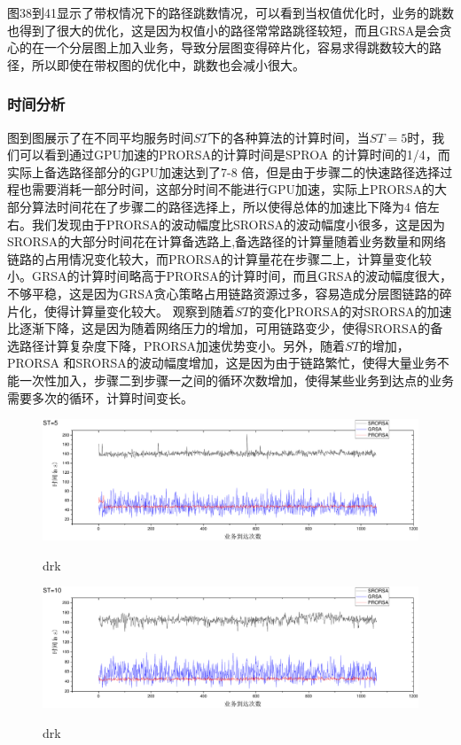图38到41显示了带权情况下的路径跳数情况，可以看到当权值优化时，业务的跳数也得到了很大的优化，这是因为权值小的路径常常路跳径较短，而且GRSA是会贪心的在一个分层图上加入业务，导致分层图变得碎片化，容易求得跳数较大的路径，所以即使在带权图的优化中，跳数也会减小很大。
\subsubsection{时间分析}

图到图展示了在不同平均服务时间$ST$下的各种算法的计算时间，当$ST=5$时，我们可以看到通过GPU加速的PRORSA的计算时间是SPROA 的计算时间的1/4，而实际上备选路径部分的GPU加速达到了7-8 倍，但是由于步骤二的快速路径选择过程也需要消耗一部分时间，这部分时间不能进行GPU加速，实际上PRORSA的大部分算法时间花在了步骤二的路径选择上，所以使得总体的加速比下降为4 倍左右。我们发现由于PRORSA的波动幅度比SRORSA的波动幅度小很多，这是因为SRORSA的大部分时间花在计算备选路上,备选路径的计算量随着业务数量和网络链路的占用情况变化较大，而PRORSA的计算量花在步骤二上，计算量变化较小。GRSA的计算时间略高于PRORSA的计算时间，而且GRSA的波动幅度很大，不够平稳，这是因为GRSA贪心策略占用链路资源过多，容易造成分层图链路的碎片化，使得计算量变化较大。
 观察到随着$ST$的变化PRORSA的对SRORSA的加速比逐渐下降，这是因为随着网络压力的增加，可用链路变少，使得SRORSA的备选路径计算复杂度下降，PRORSA加速优势变小。另外，随着$ST$的增加，PRORSA 和SRORSA的波动幅度增加，这是因为由于链路繁忙，使得大量业务不能一次性加入，步骤二到步骤一之间的循环次数增加，使得某些业务到达点的业务需要多次的循环，计算时间变长。
\begin{figure}
\setlength{\belowcaptionskip}{-0.5cm}
  \begin{center}
    {\includegraphics[width=1 \textwidth]{figures/H5T.pdf}}
    \end{center}
  \caption{{\footnotesize{drk}}}
  \label{drk}
\end{figure}
\begin{figure}
\setlength{\belowcaptionskip}{-0.5cm}
  \begin{center}
    {\includegraphics[width=1 \textwidth]{figures/H10T.pdf}}
    \end{center}
  \caption{{\footnotesize{drk}}}
  \label{drk}
\end{figure}
